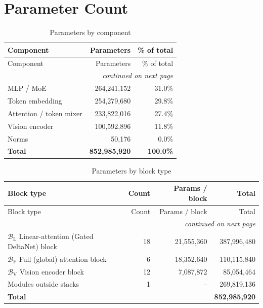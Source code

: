 \documentclass[10pt,a4paper]{article}
\theoremstyle{definition}
\begin{document}
\section{Parameter Count}
\begin{longtable}{lrr}
\caption{Parameters by component}\\
\toprule
Component & Parameters & \% of total \\
\midrule
\endfirsthead
\toprule
Component & Parameters & \% of total \\
\midrule
\endhead
\midrule \multicolumn{3}{r}{\textit{continued on next page}} \\
\endfoot
\bottomrule
\endlastfoot
MLP / MoE & 264,241,152 & 31.0\% \\
Token embedding & 254,279,680 & 29.8\% \\
Attention / token mixer & 233,822,016 & 27.4\% \\
Vision encoder & 100,592,896 & 11.8\% \\
Norms & 50,176 & 0.0\% \\
\midrule \textbf{Total} & \textbf{852,985,920} & \textbf{100.0\%} \\
\end{longtable}
\begin{longtable}{p{8cm}rrr}
\caption{Parameters by block type}\\
\toprule
Block type & Count & Params / block & Total \\
\midrule
\endfirsthead
\toprule
Block type & Count & Params / block & Total \\
\midrule
\endhead
\midrule \multicolumn{4}{r}{\textit{continued on next page}} \\
\endfoot
\bottomrule
\endlastfoot
$\mathcal{B}_{\mathrm{L}}$ Linear-attention (Gated DeltaNet) block & 18 & 21,555,360 & 387,996,480 \\
$\mathcal{B}_{\mathrm{F}}$ Full (global) attention block & 6 & 18,352,640 & 110,115,840 \\
$\mathcal{B}_{\mathrm{V}}$ Vision encoder block & 12 & 7,087,872 & 85,054,464 \\
Modules outside stacks & 1 & -- & 269,819,136 \\
\midrule \textbf{Total} & & & \textbf{852,985,920} \\
\end{longtable}
\end{document}
